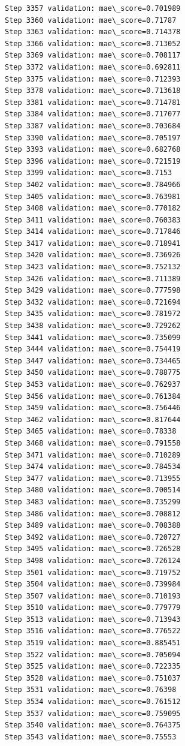\documentclass[11pt]{article}
\begin{document}
\begin{Verbatim}[commandchars=\\\{\}]
Step 3357 validation: mae\_score=0.701989
Step 3360 validation: mae\_score=0.71787
Step 3363 validation: mae\_score=0.714378
Step 3366 validation: mae\_score=0.713052
Step 3369 validation: mae\_score=0.708117
Step 3372 validation: mae\_score=0.692811
Step 3375 validation: mae\_score=0.712393
Step 3378 validation: mae\_score=0.713618
Step 3381 validation: mae\_score=0.714781
Step 3384 validation: mae\_score=0.717077
Step 3387 validation: mae\_score=0.703684
Step 3390 validation: mae\_score=0.705197
Step 3393 validation: mae\_score=0.682768
Step 3396 validation: mae\_score=0.721519
Step 3399 validation: mae\_score=0.7153
Step 3402 validation: mae\_score=0.784966
Step 3405 validation: mae\_score=0.763981
Step 3408 validation: mae\_score=0.770182
Step 3411 validation: mae\_score=0.760383
Step 3414 validation: mae\_score=0.717846
Step 3417 validation: mae\_score=0.718941
Step 3420 validation: mae\_score=0.736926
Step 3423 validation: mae\_score=0.752132
Step 3426 validation: mae\_score=0.711389
Step 3429 validation: mae\_score=0.777598
Step 3432 validation: mae\_score=0.721694
Step 3435 validation: mae\_score=0.781972
Step 3438 validation: mae\_score=0.729262
Step 3441 validation: mae\_score=0.735099
Step 3444 validation: mae\_score=0.754419
Step 3447 validation: mae\_score=0.734465
Step 3450 validation: mae\_score=0.788775
Step 3453 validation: mae\_score=0.762937
Step 3456 validation: mae\_score=0.761384
Step 3459 validation: mae\_score=0.756446
Step 3462 validation: mae\_score=0.817644
Step 3465 validation: mae\_score=0.78338
Step 3468 validation: mae\_score=0.791558
Step 3471 validation: mae\_score=0.710289
Step 3474 validation: mae\_score=0.784534
Step 3477 validation: mae\_score=0.713955
Step 3480 validation: mae\_score=0.700514
Step 3483 validation: mae\_score=0.735299
Step 3486 validation: mae\_score=0.708812
Step 3489 validation: mae\_score=0.708388
Step 3492 validation: mae\_score=0.720727
Step 3495 validation: mae\_score=0.726528
Step 3498 validation: mae\_score=0.726124
Step 3501 validation: mae\_score=0.719752
Step 3504 validation: mae\_score=0.739984
Step 3507 validation: mae\_score=0.710193
Step 3510 validation: mae\_score=0.779779
Step 3513 validation: mae\_score=0.713943
Step 3516 validation: mae\_score=0.776522
Step 3519 validation: mae\_score=0.885451
Step 3522 validation: mae\_score=0.705094
Step 3525 validation: mae\_score=0.722335
Step 3528 validation: mae\_score=0.751037
Step 3531 validation: mae\_score=0.76398
Step 3534 validation: mae\_score=0.761512
Step 3537 validation: mae\_score=0.759095
Step 3540 validation: mae\_score=0.764375
Step 3543 validation: mae\_score=0.75553

\end{Verbatim}
\end{document}
